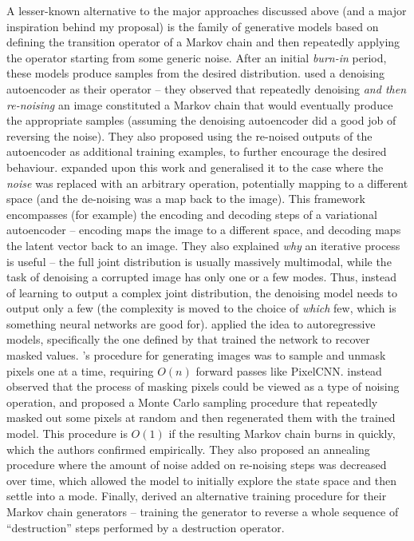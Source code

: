 \documentclass[11pt, a4paper, openany]{book}
\newcommand{\nquote}[1]{``{#1}''}
\begin{document}
A lesser-known alternative to the major approaches discussed above (and a major inspiration behind my proposal) is the family of generative models based on defining the transition operator of a Markov chain and then repeatedly applying the operator starting from some generic noise. After an initial \emph{burn-in} period, these models produce samples from the desired distribution. \citet{denoisinggenerative} used a denoising autoencoder as their operator -- they observed that repeatedly denoising \emph{and then re-noising} an image constituted a Markov chain that would eventually produce the appropriate samples (assuming the denoising autoencoder did a good job of reversing the noise). They also proposed using the re-noised outputs of the autoencoder as additional training examples, to further encourage the desired behaviour. \citet{gsn} expanded upon this work and generalised it to the case where the \emph{noise} was replaced with an arbitrary operation, potentially mapping to a different space (and the de-noising was a map back to the image). This framework encompasses (for example) the encoding and decoding steps of a variational autoencoder -- encoding maps the image to a different space, and decoding maps the latent vector back to an image. They also explained \emph{why} an iterative process is useful -- the full joint distribution is usually massively multimodal, while the task of denoising a corrupted image has only one or a few modes. Thus, instead of learning to output a complex joint distribution, the denoising model needs to output only a few (the complexity is moved to the choice of \emph{which} few, which is something neural networks are good for). \citet{gsnnade} applied the idea to autoregressive models, specifically the one defined by \citet{dnade} that trained the network to recover masked values. \citet{dnade}'s procedure for generating images was to sample and unmask pixels one at a time, requiring $O(n)$ forward passes like PixelCNN. \citet{gsnnade} instead observed that the process of masking pixels could be viewed as a type of noising operation, and proposed a Monte Carlo sampling procedure that repeatedly masked out some pixels at random and then regenerated them with the trained model. This procedure is $O(1)$ if the resulting Markov chain burns in quickly, which the authors confirmed empirically. They also proposed an annealing procedure where the amount of noise added on re-noising steps was decreased over time, which allowed the model to initially explore the state space and then settle into a mode. Finally, \citet{transitionstochastic} derived an alternative training procedure for their Markov chain generators -- training the generator to reverse a whole sequence of \nquote{destruction} steps performed by a destruction operator.
\end{document}
